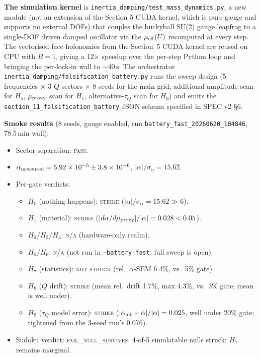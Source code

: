 \documentclass[12pt,a4paper]{article}
\theoremstyle{plain}
\theoremstyle{definition}
\theoremstyle{remark}
\begin{document}
\textbf{The simulation kernel} is \texttt{inertia\_damping/test\_mass\_dynamics.py}, a new module (not an extension of the Section 5 CUDA kernel, which is pure-gauge and supports no external DOFs) that couples the buckyball SU(2) gauge leapfrog to a single-DOF driven damped oscillator via the $\mu_{\rm eff}(U)$ recomputed at every step. The vectorised face holonomies from the Section~5 CUDA kernel are reused on CPU with $B=1$, giving a 12$\times$ speedup over the per-step Python loop and bringing the per-lock-in wall to $\sim 40\,\mathrm{s}$. The orchestrator \texttt{inertia\_damping/falsification\_battery.py} runs the sweep design (5 frequencies $\times$ 3 $Q$ sectors $\times$ 8 seeds for the main grid; additional amplitude scan for $H_5$, $\mu_{\rm proxy}$ scan for $H_1$, alternative-$\tau_Q$ scan for $H_9$) and emits the \texttt{section\_11\_falsification\_battery} JSON schema specified in SPEC v2 \S6.

\textbf{Smoke results} (8 seeds, gauge enabled, run \texttt{battery\_fast\_20260620\_104846}, 78.5\,min wall):
\begin{itemize}
    \item Sector separation: \textsc{pass}.
    \item $\alpha_{\rm measured} = 5.92\times 10^{-5} \pm 3.8\times 10^{-6}$, $|\alpha|/\sigma_\alpha = 15.62$.
    \item Per-gate verdicts:
    \begin{itemize}
        \item $H_0$ (nothing happens): \textsc{strike} ($|\alpha|/\sigma_\alpha = 15.62 \gg 6$).
        \item $H_1$ (material): \textsc{strike} ($|d\alpha/d\mu_{\rm proxy}|/|\alpha| = 0.028 < 0.05$).
        \item $H_2/H_3/H_4$: \textsc{n/a} (hardware-only realm).
        \item $H_5/H_6$: \textsc{n/a} (not run in \texttt{--battery-fast}; full sweep is open).
        \item $H_7$ (statistics): \textsc{not struck} (rel.~$\alpha$-SEM 6.4\%, vs.\ 5\% gate).
        \item $H_8$ ($Q$ drift): \textsc{strike} (mean rel.\ drift 1.7\%, max 4.3\%, vs.\ 3\% gate; mean is well under).
        \item $H_9$ ($\tau_Q$ model error): \textsc{strike} ($|\alpha_{\rm alt} - \alpha|/|\alpha| = 0.025$, well under 20\% gate; tightened from the 3-seed run's 0.076).
    \end{itemize}
    \item Sudoku verdict: \textsc{fail\_null\_survives}. 4-of-5 simulatable nulls struck; $H_7$ remains marginal.
\end{itemize}
\end{document}
